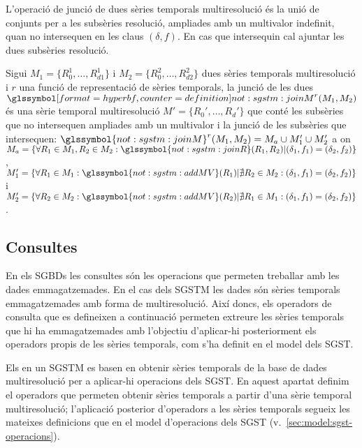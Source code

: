 L'operació de junció de dues sèries temporals multiresolució
és la unió de conjunts per a les subsèries resolució, ampliades amb un
multivalor indefinit, quan no intersequen en les claus $(\delta,f)$. En
cas que intersequin cal ajuntar les dues subsèries resolució.
\begin{definition}
  Sigui $M_1=\{R_0^1,\dotsc,R_{d1}^1\}$ i
  $M_2=\{R_0^2,\dotsc,R_{d2}^2\}$ dues sèries temporals multiresolució
  i $r$ una funció de representació de sèries temporals, la junció de
  les dues $\glssymboldef{not:sgstm:joinM}^r(M_1, M_2)$ és una sèrie
  temporal multiresolució $M'=\{R_0',\dotsc,R_d'\}$ que conté les
  subsèries que no intersequen ampliades amb un multivalor i la junció
  de les subsèries que intersequen:
  $\glssymbol{not:sgstm:joinM}^r(M_1, M_2)= M_{a} \cup M'_{1} \cup
  M'_{2}$ a on $M_a = \{\forall R_1\in M_1,R_2\in M_2:
  \glssymbol{not:sgstm:joinR}(R_1,R_2) | (\delta_1,f_1) =
  (\delta_2,f_2) \}$, $M_1' = \{\forall R_1\in M_1:
  \glssymbol{not:sgstm:addMV}(R_1)| \nexists R_2 \in M_2 :
  (\delta_1,f_1) = (\delta_2,f_2) \}$ i $M_2' = \{\forall R_2\in M_2:
  \glssymbol{not:sgstm:addMV}(R_2)| \nexists R_1 \in M_1 :
  (\delta_1,f_1) = (\delta_2,f_2) \}$.
\end{definition}





\subsection{Consultes}


En els \glspl{SGBD} les consultes són les
operacions que permeten treballar amb les dades emmagatzemades. En el
cas dels \gls{SGSTM} les dades són sèries temporals emmagatzemades amb forma
de multiresolució. Així doncs, els operadors de consulta que es
defineixen a continuació permeten extreure les sèries temporals que hi
ha emmagatzemades amb l'objectiu d’aplicar-hi posteriorment els
operadors propis de les sèries temporals, com s'ha definit en el model
dels \gls{SGST}.

Els  en un
\gls{SGSTM} es basen en obtenir sèries temporals de la base de dades
multiresolució per a aplicar-hi operacions dels \gls{SGST}.  En
aquest apartat definim el operadors que permeten obtenir sèries
temporals a partir d'una sèrie temporal multiresolució; l'aplicació
posterior d'operadors a les sèries temporals segueix les mateixes
definicions que en el model d'operacions dels \gls{SGST}
(v.~\autoref{sec:model:sgst-operacions}).

